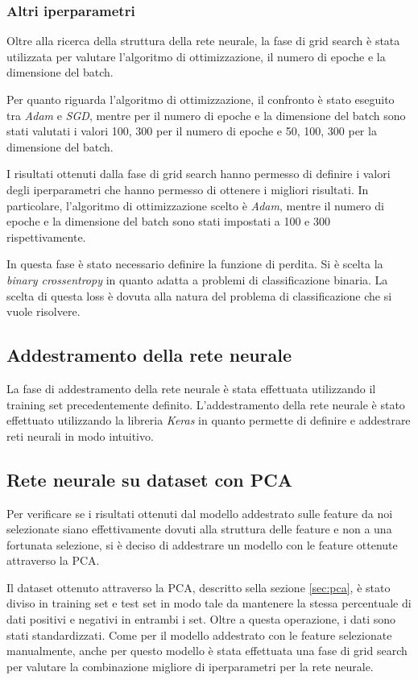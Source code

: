 \subsubsection{Altri iperparametri}
Oltre alla ricerca della struttura della rete neurale, la fase di grid search è
stata utilizzata per valutare l'algoritmo di ottimizzazione, il numero di epoche
e la dimensione del batch.

Per quanto riguarda l'algoritmo di ottimizzazione, il confronto è stato eseguito
tra \textit{Adam} e \textit{SGD}, mentre per il numero di epoche e la dimensione
del batch sono stati valutati i valori 100, 300 per il numero di epoche e 50,
100, 300 per la dimensione del batch.

I risultati ottenuti dalla fase di grid search hanno permesso di definire i valori
degli iperparametri che hanno permesso di ottenere i migliori risultati. In
particolare, l'algoritmo di ottimizzazione scelto è \textit{Adam}, mentre il
numero di epoche e la dimensione del batch sono stati impostati a 100 e 300
rispettivamente.

In questa fase è stato necessario definire la funzione di perdita. Si è scelta
la \textit{binary crossentropy} in quanto adatta a problemi di classificazione
binaria. La scelta di questa loss è dovuta alla natura del problema di
classificazione che si vuole risolvere.
\subsection{Addestramento della rete neurale}
La fase di addestramento della rete neurale è stata effettuata utilizzando il
training set precedentemente definito. L'addestramento della rete neurale è stato
effettuato utilizzando la libreria \textit{Keras} in quanto permette di definire
e addestrare reti neurali in modo intuitivo.
\subsection{Rete neurale su dataset con PCA}
Per verificare se i risultati ottenuti dal modello addestrato sulle feature da
noi selezionate siano effettivamente dovuti alla struttura delle feature e non
a una fortunata selezione, si è deciso di addestrare un modello con le feature
ottenute attraverso la PCA.

Il dataset ottenuto attraverso la PCA, descritto sella sezione \ref{sec:pca}, è
stato diviso in training set e test set in modo tale da mantenere la stessa
percentuale di dati positivi e negativi in entrambi i set. Oltre a questa
operazione, i dati sono stati standardizzati.
Come per il modello addestrato con le feature selezionate manualmente, anche per
questo modello è stata effettuata una fase di grid search per valutare la
combinazione migliore di iperparametri per la rete neurale.

